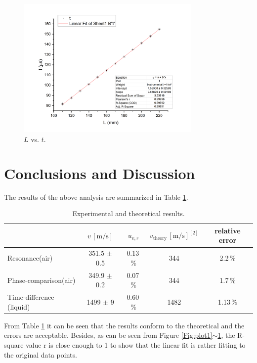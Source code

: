 \documentclass[a4paper]{article}
\begin{document}
\begin{figure}[htbp]
\centering
\includegraphics[width=0.8\textwidth]{plot3.png}
\caption{$L$ vs. $t$.}\label{Fig:plot3}
\end{figure}



\section{Conclusions and Discussion}
The results of the above analysis are summarized in Table \ref{Tab:result}.

\begin{table}[H]
\centering
\begin{tabular}{lcccc}
\toprule
& $v\,[\text{m/s}]$ & $u_{v,r}$ & $v_{\text{theory}}\,[\text{m/s}]^{[2]}$ & relative error\\
\midrule
Resonance(air) & 351.5 $\pm$ 0.5 & 0.13\,$\%$ & 344 & 2.2\,$\%$\\
Phase-comparison(air) & 349.9 $\pm$ 0.2 & 0.07\,$\%$ & 344 & 1.7\,$\%$\\
Time-difference (liquid) & 1499 $\pm$ 9 & 0.60\,$\%$ & 1482 & 1.13\,$\%$\\
\bottomrule
\end{tabular}
\caption{Experimental and theoretical results.}\label{Tab:result}
\end{table}

From Table \ref{Tab:result} it can be seen that the results conform to the theoretical and the errors are acceptable. Besides, as can be seen from Figure \ref{Fig:plot1}$\sim$\ref{Fig:plot3}, the R-square value r is close enough to 1 to show that the linear fit is rather fitting to the original data points. 
\end{document}
